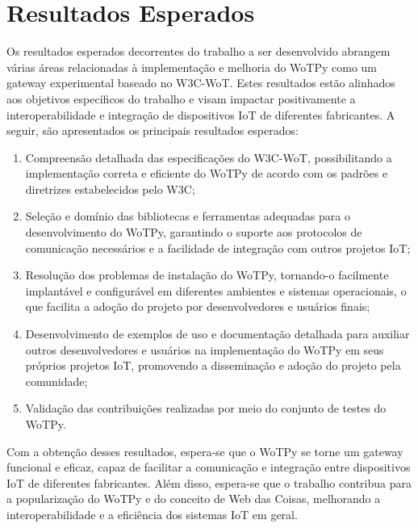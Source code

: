 \chapter{Resultados Esperados}


Os resultados esperados decorrentes do trabalho a ser desenvolvido abrangem várias áreas relacionadas à implementação e melhoria do WoTPy como um gateway experimental baseado no W3C-WoT. Estes resultados estão alinhados aos objetivos específicos do trabalho e visam impactar positivamente a interoperabilidade e integração de dispositivos IoT de diferentes fabricantes. A seguir, são apresentados os principais resultados esperados:

\begin{enumerate}
    \item Compreensão detalhada das especificações do W3C-WoT, possibilitando a implementação correta e eficiente do WoTPy de acordo com os padrões e diretrizes estabelecidos pelo W3C;
    \item Seleção e domínio das bibliotecas e ferramentas adequadas para o desenvolvimento do WoTPy, garantindo o suporte aos protocolos de comunicação necessários e a facilidade de integração com outros projetos IoT;
    \item Resolução dos problemas de instalação do WoTPy, tornando-o facilmente implantável e configurável em diferentes ambientes e sistemas operacionais, o que facilita a adoção do projeto por desenvolvedores e usuários finais;
    \item Desenvolvimento de exemplos de uso e documentação detalhada para auxiliar outros desenvolvedores e usuários na implementação do WoTPy em seus próprios projetos IoT, promovendo a disseminação e adoção do projeto pela comunidade;
    \item Validação das contribuições realizadas por meio do conjunto de testes do WoTPy.
\end{enumerate}

Com a obtenção desses resultados, espera-se que o WoTPy se torne um gateway funcional e eficaz, capaz de facilitar a comunicação e integração entre dispositivos IoT de diferentes fabricantes. Além disso, espera-se que o trabalho contribua para a popularização do WoTPy e do conceito de Web das Coisas, melhorando a interoperabilidade e a eficiência dos sistemas IoT em geral.

 